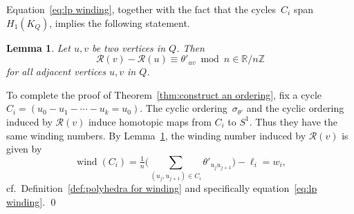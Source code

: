 \documentclass[11pt, letterpaper]{amsart}
\newtheorem{lemma}[theorem]{Lemma}
\theoremstyle{definition}
\numberwithin{equation}{section}
\def\ZZ{{\mathbb Z}}
\def\wind{{\operatorname{wind}}}
\newcommand\GQ{K_Q}
\begin{document}
Equation~\eqref{eq:lp winding}, together with the fact that the cycles~$C_i$ span $H_1(\GQ)$, 
implies the following statement. 

\begin{lemma}
\label{lem:respect all distances}
Let $u,v$ be two vertices in $Q$. 
Then 
$$\mathcal{R}(v) - \mathcal{R}(u) \equiv \theta'_{uv} \bmod n \in \mathbb R / n \ZZ$$
 for all adjacent vertices $u,v$ in $Q$.
\end{lemma}


To complete the proof of Theorem~\ref{thm:construct an ordering},  
fix a cycle $C_i = (u_0 - u_1 - \cdots - u_k = u_0)$. 
The cyclic ordering~$\sigma_{\theta'}$ and the cyclic ordering induced by $\mathcal{R}(v)$ induce homotopic maps from $C_i$ to $S^1$.
Thus they have the same winding numbers.
By Lemma~\ref{lem:respect all distances}, the winding number induced by $\mathcal{R}(v)$
is given by 
\begin{equation*}
\wind(C_i) = \tfrac{1}{n} \Big ( \sum_{(u_j, u_{j+1}) \in C_i} \theta'_{u_j  u_{j+1}} \Big ) - \ell_i = w_i,
\end{equation*}
cf.\ Definition~\ref{def:polyhedra for winding} and specifically equation~\eqref{eq:lp winding}. 
\qed
\end{document}
